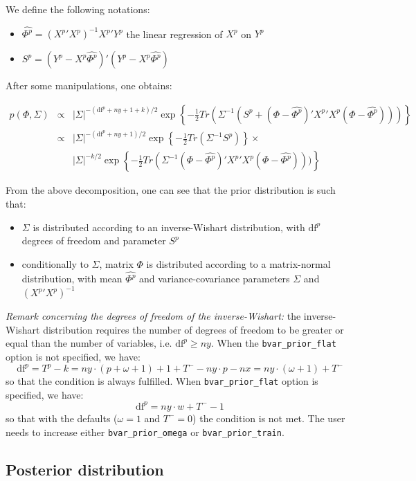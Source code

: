 \documentclass[10pt,a4paper]{article}
\newcommand{\df}{\text{df}}
\begin{document}
We define the following notations:
\begin{itemize}
\item $\hat{\Phi^p} = ({X^p}'X^p)^{-1} {X^p}' Y^p$ the linear regression of $X^p$ on $Y^p$
\item $S^p = (Y^p - X^p\hat{\Phi^p})'(Y^p - X^p\hat{\Phi^p})$
\end{itemize}

After some manipulations, one obtains:

\begin{eqnarray*}
p(\Phi, \Sigma) & \propto & |\Sigma|^{-(\df^p + ny + 1 + k)/2} \exp\left\{-\frac{1}{2}Tr(\Sigma^{-1}(S^p + (\Phi-\hat{\Phi^p})'{X^p}'X^p(\Phi-\hat{\Phi^p})))\right\} \\
& \propto & |\Sigma|^{-(\df^p + ny + 1)/2} \exp\left\{-\frac{1}{2}Tr(\Sigma^{-1}S^p)\right\} \times \\
& & |\Sigma|^{-k/2}\exp\left\{-\frac{1}{2}Tr(\Sigma^{-1}(\Phi-\hat{\Phi^p})'{X^p}'X^p(\Phi-\hat{\Phi^p})))\right\}
\end{eqnarray*}

From the above decomposition, one can see that the prior distribution is such that:
\begin{itemize}
\item $\Sigma$ is distributed according to an inverse-Wishart distribution, with $\df^p$ degrees of freedom and parameter $S^p$
\item conditionally to $\Sigma$, matrix $\Phi$ is distributed according to a matrix-normal distribution, with mean $\hat{\Phi^p}$ and variance-covariance parameters $\Sigma$ and $({X^p}'X^p)^{-1}$
\end{itemize}

\emph{Remark concerning the degrees of freedom of the inverse-Wishart:} the inverse-Wishart distribution requires the number of degrees of freedom to be greater or equal than the number of variables, i.e. $\df^p \geq ny$. When the \texttt{bvar\_prior\_flat} option is not specified, we have:
$$\df^p = T^p - k = ny\cdot(p+\omega+1)+1+T^--ny\cdot p-nx = ny\cdot(\omega+1)+T^-$$
so that the condition is always fulfilled. When \texttt{bvar\_prior\_flat} option is specified, we have:
$$\df^p = ny\cdot w + T^- - 1$$
so that with the defaults ($\omega = 1$ and $T^- = 0$) the condition is not met. The user needs to increase either \texttt{bvar\_prior\_omega} or \texttt{bvar\_prior\_train}.

\subsection{Posterior distribution}
\end{document}
